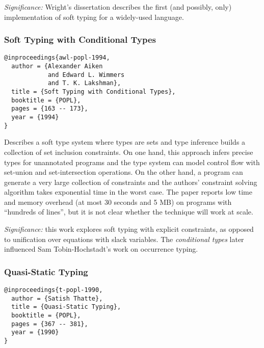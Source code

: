 \documentclass{article}
\begin{document}

\emph{Significance:} Wright's dissertation describes the first (and possibly,
only) implementation of soft typing for a widely-used language.


\newpage
\subsubsection*{Soft Typing with Conditional Types}
\begin{verbatim}
@inproceedings{awl-popl-1994,
  author = {Alexander Aiken
            and Edward L. Wimmers
            and T. K. Lakshman},
  title = {Soft Typing with Conditional Types},
  booktitle = {POPL},
  pages = {163 -- 173},
  year = {1994}
}
\end{verbatim}

Describes a soft type system where types are sets and type inference builds a
collection of set inclusion constraints.
On one hand, this approach infers precise types for unannotated programs
and the type system can model control flow with set-union and set-intersection
operations.
On the other hand, a program can generate a very large collection of
constraints and the authors' constraint solving algorithm takes exponential
time in the worst case.
The paper reports low time and memory overhead (at most 30 seconds and 5 MB)
on programs with ``hundreds of lines'', but it is not clear whether the
technique will work at scale.


\emph{Significance:} this work explores soft typing with explicit
 constraints, as opposed to unification over equations with slack variables.
 The \emph{conditional types} later influenced Sam Tobin-Hochstadt's work on
 occurrence typing.


\newpage
\subsubsection*{Quasi-Static Typing}
\begin{verbatim}
@inproceedings{t-popl-1990,
  author = {Satish Thatte},
  title = {Quasi-Static Typing},
  booktitle = {POPL},
  pages = {367 -- 381},
  year = {1990}
}
\end{verbatim}
\end{document}
